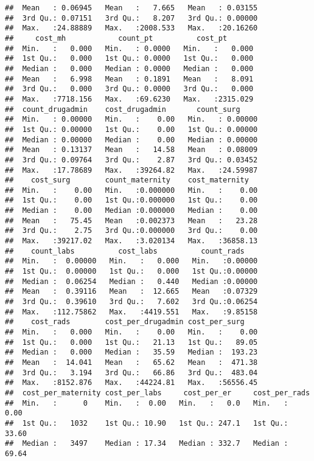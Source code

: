 \documentclass[]{article}
\begin{document}
\begin{verbatim}
##  Mean   : 0.06945   Mean   :   7.665   Mean   : 0.03155  
##  3rd Qu.: 0.07151   3rd Qu.:   8.207   3rd Qu.: 0.00000  
##  Max.   :24.88889   Max.   :2008.533   Max.   :20.16260  
##     cost_mh            count_pt          cost_pt        
##  Min.   :   0.000   Min.   : 0.0000   Min.   :   0.000  
##  1st Qu.:   0.000   1st Qu.: 0.0000   1st Qu.:   0.000  
##  Median :   0.000   Median : 0.0000   Median :   0.000  
##  Mean   :   6.998   Mean   : 0.1891   Mean   :   8.091  
##  3rd Qu.:   0.000   3rd Qu.: 0.0000   3rd Qu.:   0.000  
##  Max.   :7718.156   Max.   :69.6230   Max.   :2315.029  
##  count_drugadmin    cost_drugadmin       count_surg      
##  Min.   : 0.00000   Min.   :    0.00   Min.   : 0.00000  
##  1st Qu.: 0.00000   1st Qu.:    0.00   1st Qu.: 0.00000  
##  Median : 0.00000   Median :    0.00   Median : 0.00000  
##  Mean   : 0.13137   Mean   :   14.58   Mean   : 0.08009  
##  3rd Qu.: 0.09764   3rd Qu.:    2.87   3rd Qu.: 0.03452  
##  Max.   :17.78689   Max.   :39264.82   Max.   :24.59987  
##    cost_surg        count_maternity    cost_maternity    
##  Min.   :    0.00   Min.   :0.000000   Min.   :    0.00  
##  1st Qu.:    0.00   1st Qu.:0.000000   1st Qu.:    0.00  
##  Median :    0.00   Median :0.000000   Median :    0.00  
##  Mean   :   75.45   Mean   :0.002373   Mean   :   23.28  
##  3rd Qu.:    2.75   3rd Qu.:0.000000   3rd Qu.:    0.00  
##  Max.   :39217.02   Max.   :3.020134   Max.   :36858.13  
##    count_labs          cost_labs          count_rads     
##  Min.   :  0.00000   Min.   :   0.000   Min.   :0.00000  
##  1st Qu.:  0.00000   1st Qu.:   0.000   1st Qu.:0.00000  
##  Median :  0.06254   Median :   0.440   Median :0.00000  
##  Mean   :  0.39116   Mean   :  12.665   Mean   :0.07329  
##  3rd Qu.:  0.39610   3rd Qu.:   7.602   3rd Qu.:0.06254  
##  Max.   :112.75862   Max.   :4419.551   Max.   :9.85158  
##    cost_rads        cost_per_drugadmin cost_per_surg     
##  Min.   :   0.000   Min.   :    0.00   Min.   :    0.00  
##  1st Qu.:   0.000   1st Qu.:   21.13   1st Qu.:   89.05  
##  Median :   0.000   Median :   35.59   Median :  193.23  
##  Mean   :  14.041   Mean   :   65.62   Mean   :  471.38  
##  3rd Qu.:   3.194   3rd Qu.:   66.86   3rd Qu.:  483.04  
##  Max.   :8152.876   Max.   :44224.81   Max.   :56556.45  
##  cost_per_maternity cost_per_labs     cost_per_er     cost_per_rads    
##  Min.   :      0    Min.   :  0.00   Min.   :   0.0   Min.   :   0.00  
##  1st Qu.:   1032    1st Qu.: 10.90   1st Qu.: 247.1   1st Qu.:  33.60  
##  Median :   3497    Median : 17.34   Median : 332.7   Median :  69.64  

\end{verbatim}
\end{document}
